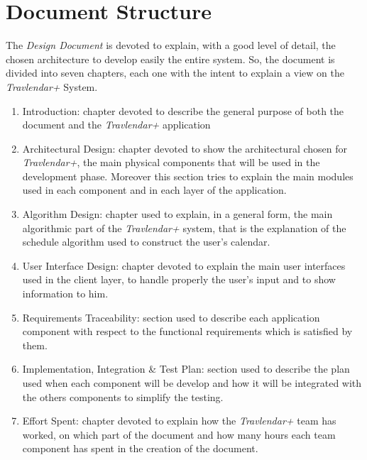 \section{Document Structure}
The \emph{Design Document} is devoted to explain, with a good level of detail, the chosen architecture to develop easily the entire system. So, the document is divided into seven chapters, each one with the intent to explain a view on the \emph{Travlendar+} System.

\begin{enumerate}

    \item Introduction: chapter devoted to describe the general purpose of both the document and the \emph{Travlendar+} application
    
    \item Architectural Design: chapter devoted to show the architectural chosen for \emph{Travlendar+}, the main physical components that will be used in the development phase. Moreover this section tries to explain the main modules used in each component and in each layer of the application.
    
    \item Algorithm Design: chapter used to explain, in a general form, the main algorithmic part of the \emph{Travlendar+} system, that is the explanation of the schedule algorithm used to construct the user's calendar.
    
    \item User Interface Design: chapter devoted to explain the main user interfaces used in the client layer, to handle properly the user's input and to show information to him.
    
    \item Requirements Traceability: section used to describe each application component with respect to the functional requirements which is satisfied by them.
    
    \item Implementation, Integration \& Test Plan: section used to describe the plan used when each component will be develop and how it will be integrated with the others components to simplify the testing.
    
    \item Effort Spent: chapter devoted to explain how the \emph{Travlendar+} team has worked, on which part of the document and how many hours each team component has spent in the creation of the document.
\end{enumerate}